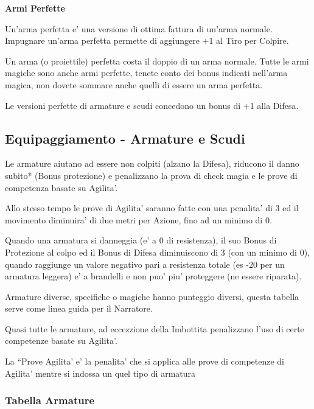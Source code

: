 \documentclass[a4paper,11pt,twoside,openany]{dndbook}
\begin{document}
{\medskip

\textbf{Armi Perfette}
	
Un'arma perfetta e' una versione di ottima fattura di un'arma normale.
Impugnare un'arma perfetta permette di aggiungere +1 al Tiro per Colpire.
	
Un arma (o proiettile) perfetta costa il doppio di un arma normale. 
Tutte le armi magiche sono anche armi perfette, tenete conto dei bonus 	indicati nell'arma magica, non dovete sommare anche quelli di essere un arma perfetta.
		
Le versioni perfette di armature e scudi concedono un bonus di +1 alla Difesa.



\pagebreak

\subsection{Equipaggiamento - Armature e Scudi}

\label{equipaggiamento---armature-e-scudi}

Le armature aiutano ad essere non colpiti (alzano la Difesa), riducono il danno subito{*} (Bonus protezione) e penalizzano la prova di check magia e le prove di competenza basate su Agilita'.

Allo stesso tempo le prove di Agilita' saranno fatte con una penalita' di 3 ed il movimento diminuira' di due metri per Azione, fino ad un minimo di 0.

Quando una armatura si danneggia (e' a 0 di resistenza), il suo Bonus di Protezione al colpo ed il Bonus di Difesa diminuiscono di 3 (con un minimo di 0), quando raggiunge un valore negativo pari a resistenza totale (es -20 per un armatura leggera) e' a brandelli e non puo' piu' proteggere (ne essere riparata).

Armature diverse, specifiche o magiche hanno punteggio diversi, questa tabella serve come linea guida per il Narratore.

Quasi tutte le armature, ad eccezzione della Imbottita penalizzano l'uso di certe competenze basate su Agilita'. 

La ``Prove Agilita' e' la penalita' che si applica alle prove di competenze di Agilita' mentre si indossa un quel tipo di armatura 

\subsubsection{Tabella Armature}

}
\end{document}
